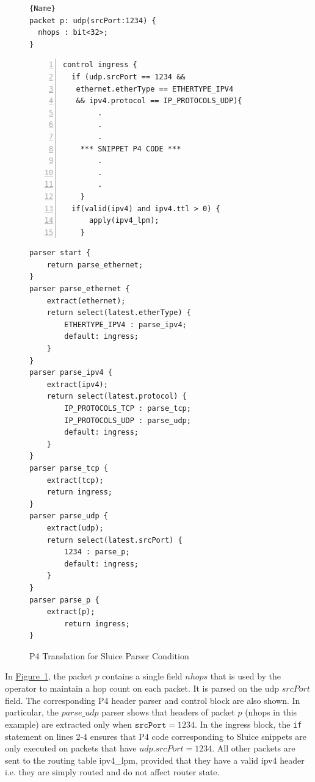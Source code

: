 \documentclass[12pt, oneside]{article}
\newcommand{\irref}[2]{\hyperref[#2]{#1~\ref{#2}}}
\begin{document}
\begin{figure}
\caption{P4 Translation for Sluice Parser Condition}\label{pca}
\noindent\begin{minipage}{.45\textwidth}
\begin{lstlisting}[basicstyle=\linespread{1.3}\scriptsize, title={Sluice Parser Condition},frame=tlrb]{Name}
packet p: udp(srcPort:1234) {
  nhops : bit<32>;
}
\end{lstlisting}
\begin{lstlisting}[numbers=left, firstnumber=1, title={P4 Ingress Control Block}, basicstyle=\linespread{1.3}\scriptsize, frame=tlrb]
control ingress {
  if (udp.srcPort == 1234 && 
   ethernet.etherType == ETHERTYPE_IPV4 
   && ipv4.protocol == IP_PROTOCOLS_UDP){
		.
		.
		.
	*** SNIPPET P4 CODE ***
		.
		.
		.
	}
  if(valid(ipv4) and ipv4.ttl > 0) {
      apply(ipv4_lpm);
    }
\end{lstlisting}

\end{minipage}\hfill
\begin{minipage}{.45\textwidth}
\begin{lstlisting}[title={P4 Parser},frame=tlrb, basicstyle=\linespread{1.08}\scriptsize]
parser start {
    return parse_ethernet;
}
parser parse_ethernet {
    extract(ethernet);
    return select(latest.etherType) {
        ETHERTYPE_IPV4 : parse_ipv4;
        default: ingress;
    }
}
parser parse_ipv4 {
    extract(ipv4);
    return select(latest.protocol) {
        IP_PROTOCOLS_TCP : parse_tcp;
        IP_PROTOCOLS_UDP : parse_udp;
        default: ingress;
    }
}
parser parse_tcp {
    extract(tcp);
    return ingress;
}
parser parse_udp {
    extract(udp);
    return select(latest.srcPort) {
        1234 : parse_p;
        default: ingress;
    }
}
parser parse_p {
    extract(p);
        return ingress;
}
\end{lstlisting}
\end{minipage}
\end{figure}


In \irref{Figure}{pca}, the packet $p$ contains a single field $nhops$ that is used by the operator to maintain a hop count on each packet. It is parsed on the udp $srcPort$ field.  The corresponding P4 header parser and control block are also shown. In particular, the $parse\_udp$ parser shows that headers of packet $p$ (nhops in this example) are extracted only when $\texttt{srcPort}=1234$. In the ingress block, the \texttt{if} statement on lines 2-4 ensures that P4 code corresponding to Sluice snippets are only executed on packets that have $udp.srcPort = 1234$. All other packets are sent to the routing table ipv4\_lpm, provided that they have a valid ipv4 header i.e. they are simply routed and do not affect router state.
\end{document}
